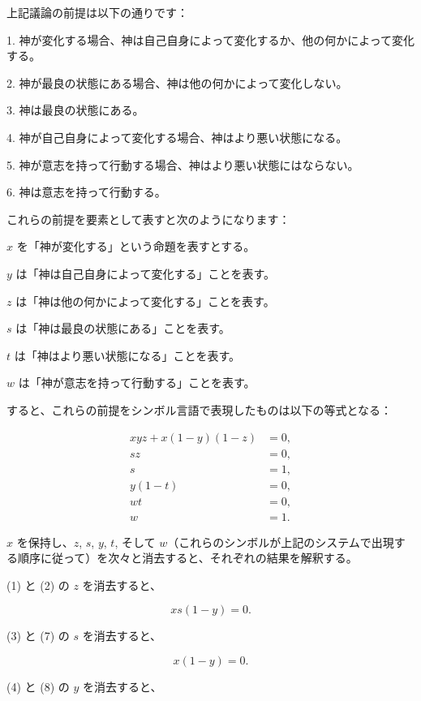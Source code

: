 \documentclass[a4paper,11pt,openany]{ltjsbook}
\begin{document}
上記議論の前提は以下の通りです：

1. 神が変化する場合、神は自己自身によって変化するか、他の何かによって変化する。

2. 神が最良の状態にある場合、神は他の何かによって変化しない。

3. 神は最良の状態にある。

4. 神が自己自身によって変化する場合、神はより悪い状態になる。

5. 神が意志を持って行動する場合、神はより悪い状態にはならない。

6. 神は意志を持って行動する。

これらの前提を要素として表すと次のようになります：

$x$ を「神が変化する」という命題を表すとする。

$y$ は「神は自己自身によって変化する」ことを表す。

$z$ は「神は他の何かによって変化する」ことを表す。

$s$ は「神は最良の状態にある」ことを表す。

$t$ は「神はより悪い状態になる」ことを表す。

$w$ は「神が意志を持って行動する」ことを表す。

すると、これらの前提をシンボル言語で表現したものは以下の等式となる：

\begin{align}
   xyz + x(1-y)(1-z) &= 0,\\
   sz &= 0,             \\
   s &= 1,              \\
   y(1-t) &= 0,         \\
   wt &= 0,             \\
   w &= 1.
\end{align}

$x$ を保持し、$z$, $s$, $y$, $t$, そして $w$（これらのシンボルが上記のシステムで出現する順序に従って）を次々と消去すると、それぞれの結果を解釈する。

(1) と (2) の $z$ を消去すると、

\begin{equation}
     xs(1-y) = 0.
\end{equation}

(3) と (7) の $s$ を消去すると、

\begin{equation}
     x(1-y) = 0.
\end{equation}

(4) と (8) の $y$ を消去すると、
\end{document}
